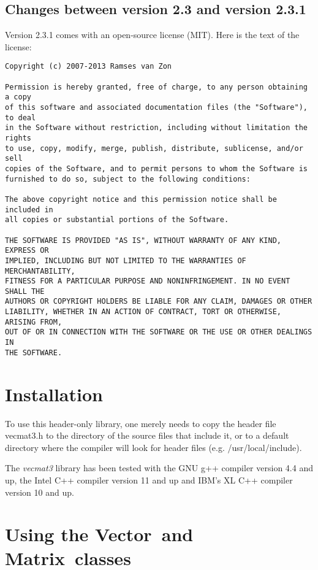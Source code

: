 \documentclass[12pt,twoside]{article}
\newcommand{\Vector}{{Vector}}
\newcommand{\Matrix}{{Matrix}}
\begin{document}
\subsection*{Changes between version 2.3 and version 2.3.1}

Version 2.3.1 comes with an open-source license (MIT). Here is the
text of the license:
\begin{verbatim}
Copyright (c) 2007-2013 Ramses van Zon

Permission is hereby granted, free of charge, to any person obtaining a copy
of this software and associated documentation files (the "Software"), to deal
in the Software without restriction, including without limitation the rights
to use, copy, modify, merge, publish, distribute, sublicense, and/or sell
copies of the Software, and to permit persons to whom the Software is
furnished to do so, subject to the following conditions:

The above copyright notice and this permission notice shall be included in
all copies or substantial portions of the Software.

THE SOFTWARE IS PROVIDED "AS IS", WITHOUT WARRANTY OF ANY KIND, EXPRESS OR
IMPLIED, INCLUDING BUT NOT LIMITED TO THE WARRANTIES OF MERCHANTABILITY,
FITNESS FOR A PARTICULAR PURPOSE AND NONINFRINGEMENT. IN NO EVENT SHALL THE
AUTHORS OR COPYRIGHT HOLDERS BE LIABLE FOR ANY CLAIM, DAMAGES OR OTHER
LIABILITY, WHETHER IN AN ACTION OF CONTRACT, TORT OR OTHERWISE, ARISING FROM,
OUT OF OR IN CONNECTION WITH THE SOFTWARE OR THE USE OR OTHER DEALINGS IN
THE SOFTWARE.
\end{verbatim}

\section{Installation}

To use this header-only library, one merely needs to copy the header
file vecmat3.h to the directory of the source files that include it,
or to a default directory where the compiler will look for header
files (e.g. /usr/local/include).

The \emph{vecmat3} library has been tested with the GNU g++ compiler version
4.4 and up, the Intel C++ compiler version 11 and up and IBM's XL C++
compiler version 10 and up.


\section{Using the \Vector\ and \Matrix\ classes}
\label{use}
\end{document}
